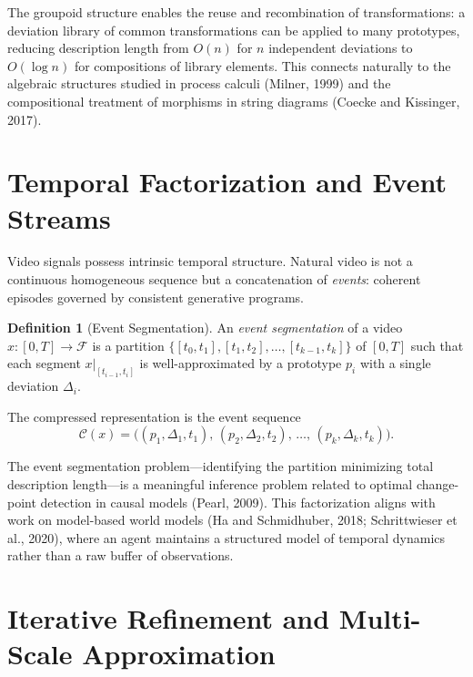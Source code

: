\documentclass[11pt,a4paper]{article}
\theoremstyle{definition}
\newtheorem{definition}[theorem]{Definition}
\theoremstyle{remark}
\begin{document}
The groupoid structure enables the reuse and recombination of transformations: a deviation library of common transformations can be applied to many prototypes, reducing description length from $O(n)$ for $n$ independent deviations to $O(\log n)$ for compositions of library elements. This connects naturally to the algebraic structures studied in process calculi (Milner, 1999) and the compositional treatment of morphisms in string diagrams (Coecke and Kissinger, 2017).

\section{Temporal Factorization and Event Streams}
\label{sec:temporal}

Video signals possess intrinsic temporal structure. Natural video is not a continuous homogeneous sequence but a concatenation of \emph{events}: coherent episodes governed by consistent generative programs.

\begin{definition}[Event Segmentation]
An \emph{event segmentation} of a video $x : [0,T] \rightarrow \mathcal{F}$ is a partition $\{[t_0, t_1], [t_1, t_2], \dots, [t_{k-1}, t_k]\}$ of $[0,T]$ such that each segment $x|_{[t_{i-1}, t_i]}$ is well-approximated by a prototype $p_i$ with a single deviation $\Delta_i$.
\end{definition}

The compressed representation is the event sequence
\[
\mathcal{C}(x) = \big((p_1, \Delta_1, t_1), \, (p_2, \Delta_2, t_2), \, \dots, \, (p_k, \Delta_k, t_k)\big).
\]

The event segmentation problem---identifying the partition minimizing total description length---is a meaningful inference problem related to optimal change-point detection in causal models (Pearl, 2009). This factorization aligns with work on model-based world models (Ha and Schmidhuber, 2018; Schrittwieser et al., 2020), where an agent maintains a structured model of temporal dynamics rather than a raw buffer of observations.

\section{Iterative Refinement and Multi-Scale Approximation}
\label{sec:multiscale}
\end{document}
